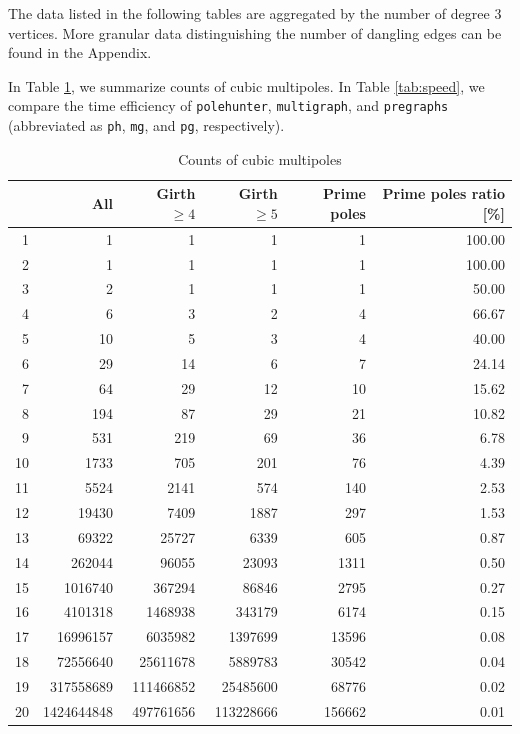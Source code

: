 The data listed in the following tables are aggregated by the number of degree $3$ vertices. More granular data distinguishing the number of dangling edges can be found in the Appendix.

In Table \ref{tab:counts}, we summarize counts of cubic multipoles. In Table \ref{tab:speed}, we compare the time efficiency of \texttt{polehunter}, \texttt{multigraph}, and \texttt{pregraphs} (abbreviated as \texttt{ph}, \texttt{mg}, and \texttt{pg}, respectively).

\begin{table}[h!]\centering
\begin{tabular}{r|rrrrr}
& All & Girth $\geq 4$ & Girth $\geq 5$ & Prime poles & Prime poles ratio [\%]\\ \hline
1 & 1 & 1 & 1 & 1 & 100.00\\
2 & 1 & 1 & 1 & 1 & 100.00\\
3 & 2 & 1 & 1 & 1 & 50.00\\
4 & 6 & 3 & 2 & 4 & 66.67\\
5 & 10 & 5 & 3 & 4 & 40.00\\
6 & 29 & 14 & 6 & 7 & 24.14\\
7 & 64 & 29 & 12 & 10 & 15.62\\
8 & 194 & 87 & 29 & 21 & 10.82\\
9 & 531 & 219 & 69 & 36 & 6.78\\
10 & 1733 & 705 & 201 & 76 & 4.39\\
11 & 5524 & 2141 & 574 & 140 & 2.53\\
12 & 19430 & 7409 & 1887 & 297 & 1.53\\
13 & 69322 & 25727 & 6339 & 605 & 0.87\\
14 & 262044 & 96055 & 23093 & 1311 & 0.50\\
15 & 1016740 & 367294 & 86846 & 2795 & 0.27\\
16 & 4101318 & 1468938 & 343179 & 6174 & 0.15\\
17 & 16996157 & 6035982 & 1397699 & 13596 & 0.08\\
18 & 72556640 & 25611678 & 5889783 & 30542 & 0.04\\
19 & 317558689 & 111466852 & 25485600 & 68776 & 0.02\\
20 & 1424644848 & 497761656 & 113228666 & 156662 & 0.01
\end{tabular}
\caption{Counts of cubic multipoles}
\label{tab:counts}
\end{table}

